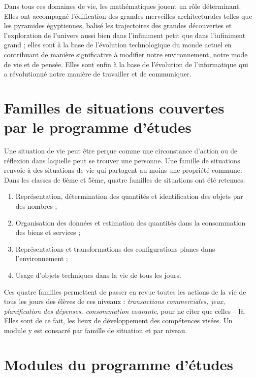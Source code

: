 Dans tous ces domaines de vie, les mathématiques jouent un rôle déterminant. Elles ont accompagné l'édification des grandes merveilles architecturales telles que les pyramides égyptiennes, balisé les trajectoires des grandes découvertes et l'exploration de l'univers aussi bien dans l'infiniment petit que dans l'infiniment grand ; elles sont à la base de l'évolution technologique du monde actuel en contribuant de manière significative à modifier notre environnement, notre mode de vie et de pensée. Elles sont enfin à la base de l'évolution de l'informatique qui a révolutionné notre manière de travailler et de communiquer.

\section*{Familles de situations couvertes par le programme d'études }

Une situation de vie peut être perçue comme une circonstance d'action ou de réflexion dans laquelle peut se trouver une personne. Une famille de situations renvoie à des situations de vie qui partagent au moins une propriété commune.
Dans les classes de 6ème et 5ème, quatre familles de situations ont été retenues:

\begin{enumerate}
\item Représentation, détermination des quantités et identification des objets par des nombres ;
\item Organisation des données et estimation des quantités dans la consommation des biens et services ;
\item Représentations et transformations des configurations planes dans l'environnement ;
\item Usage d'objets techniques dans la vie de tous les jours.
\end{enumerate}

Ces quatre familles permettent de passer en revue toutes les actions de la vie de tous les jours des élèves de ces niveaux :\textit{ transactions commerciales, jeux, planification des dépenses, consommation courante}, pour ne citer que celles – là. Elles sont de ce fait, les lieux de développement des compétences visées. Un module y est consacré par famille de situation et par niveau.

\section*{Modules du programme d'études}
